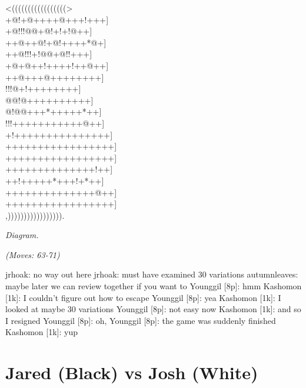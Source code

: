 \documentclass[letterpaper,12pt]{memoir}
\newcounter{GoFigure}[part]
\newcommand{\gofigure}{%
 \stepcounter{GoFigure}
 \centerline{\textit{Diagram.\thinspace\arabic{GoFigure}}}
}
\newcommand{\subtext}[1]{\centerline{\textit{#1}}}
\begin{document}
\begin{minipage}[t]{0.5\textwidth}
{\gnos
<(((((((((((((((((>\\
+@!+@++++@+++!+++]\\
+@!!!@@+@!+!+!@++]\\
++@++@!+@!++++*@+]\\
++@!!!+!@@+@!!+++]\\
+@+@++!++++!++@++]\\
++@+++@++++++++]\\
!!!@+!++++++++]\\
@@!@++++++++++]\\
@!@@+++*+++++*++]\\
!!!+++++++++++@++]\\
+!+++++++++++++++]\\
+++++++++++++++++]\\
+++++++++++++++++]\\
++++++++++++++!++]\\
++!+++++*+++!+*++]\\
++++++++++++++@++]\\
+++++++++++++++++]\\
,))))))))))))))))).\\
}
\gofigure

\subtext{(Moves: 63-71)}
\end{minipage}
\begin{minipage}[t]{0.5\textwidth}
\setlength{\parskip}{0.5em}
jrhoak: no way out here
jrhoak: must have examined 30 variations
autumnleaves: maybe later we can review together if you want to
Younggil [8p]: hmm
Kashomon [1k]: I couldn't figure out how to escape
Younggil [8p]: yea
Kashomon [1k]: I looked at maybe 30 variations
Younggil [8p]: not easy now
Kashomon [1k]: and so I resigned
Younggil [8p]: oh,
Younggil [8p]: the game was suddenly finished
Kashomon [1k]: yup


\end{minipage}
\vfill
\part{Jared (Black) vs Josh (White)}
\end{document}
